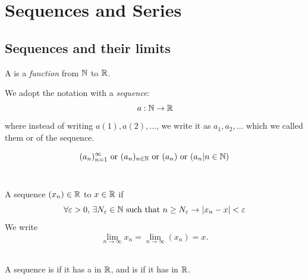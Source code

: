 \documentclass[a4paper,12pt]{article}
\begin{document}

\newpage
\section{Sequences and Series}
\subsection{Sequences and their limits}

\begin{definition}
    A  is a \textit{function} from $\mathbb{N}$ to $\mathbb{R}$.
\end{definition}


We adopt the notation with a \textit{sequence}:
\[\,a:\mathbb{N}\rightarrow\mathbb{R}\]
where instead of writing \(a(1), a(2), \dots\), we write it as \(a_1, a_2, \dots\) which we called them 
 or  of the sequence.\\

\begin{notation}

\[(a_n)_{n=1}^\infty  \text{ or }  (a_n)_{n\in\mathbb{N}}  \text{ or }  (a_n)  \text{ or }  (a_n|n\in \mathbb{N})\]\\
\end{notation}

\begin{definition}
    A sequence \((x_n)\in\mathbb{R}\)  to \(x\in\mathbb{R}\) if 
    \[\forall \varepsilon >0,\, \exists N_\varepsilon \in \mathbb{N} \text{ such that }n\ge N_\varepsilon \rightarrow\left\lvert x_n - x\right\rvert <\varepsilon\]
    We write \[\lim_{n\to\infty}x_n = \lim_{n\to\infty}(x_n) = x.\]\\
\end{definition}

\begin{definition}
    A sequence is  if it has a  in \(\mathbb{R}\), and is  if it 
    has  in $\mathbb{R}$.\\
\end{definition}
\end{document}
